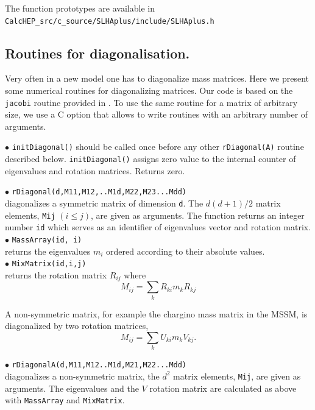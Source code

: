 \documentclass[12pt,a4paper]{article}
\begin{document}
The  function prototypes are available  in \\
\verb|CalcHEP_src/c_source/SLHAplus/include/SLHAplus.h|

\subsection{Routines for diagonalisation.}

Very often in a new model  one has to diagonalize 
mass matrices. Here we present some numerical routines for 
diagonalizing matrices. Our code is based on the \verb|jacobi| routine provided in 
 \cite{Numerical}. To use the same routine for a matrix of arbitrary size, we 
use a C option that allows to write routines with an arbitrary number of arguments. 

\noindent 
$\bullet$ \verb|initDiagonal()| should be called once  before any other 
\verb|rDiagonal(A)| routine described below. \verb|initDiagonal()| assigns zero value 
to the internal counter of  eigenvalues and rotation matrices. Returns zero.

\noindent
$\bullet$ \verb|rDiagonal(d,M11,M12,..M1d,M22,M23...Mdd)|\\
diagonalizes a symmetric matrix of dimension \verb|d|. The  
$d(d+1)/2$  matrix elements, \verb|Mij| $(i\le j)$, are given as arguments.
The function returns an integer number \verb|id| which serves as an  identifier 
of eigenvalues vector and rotation matrix.\\
\noindent
$\bullet$ \verb|MassArray(id, i)|\\ returns the eigenvalues  $m_i$ ordered according to 
their absolute values. \\
\noindent
$\bullet$ \verb|MixMatrix(id,i,j)|\\ returns the rotation matrix  $R_{ij}$ where
$$  M_{ij} = \sum\limits_k  R_{ki} m_k R_{kj}$$

A non-symmetric matrix, for example the 
chargino mass matrix in the  MSSM, is diagonalized by  two rotation matrices,
$$  M_{ij} = \sum\limits_k  U_{ki} m_k V_{kj}.$$ 

\noindent
$\bullet$ \verb|rDiagonalA(d,M11,M12..M1d,M21,M22...Mdd)|\\ 
diagonalizes a non-symmetric matrix, the $d^2$  matrix elements, \verb|Mij|, are given as arguments.
The eigenvalues and the $V$ rotation matrix are calculated as above with 
\verb|MassArray| and \verb|MixMatrix|. 
\end{document}

